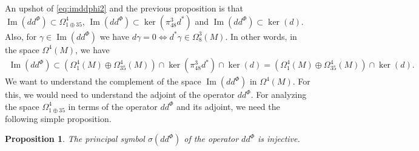 \documentclass[10pt,a4paper,reqno]{article}
\newtheorem{proposition}[theorem]{Proposition}
\theoremstyle{definition}
\numberwithin{equation}{section}
\def\G2{\mathrm{G}_2}
\def\ddphi{dd^{\Phi}}
\DeclareMathOperator{\Ima}{Im}
\begin{document}



An upshot of \cref{eq:imddphi2} and the previous proposition is that $\Ima(\ddphi)\subset \Omega^4_{1\oplus 35}$, $\Ima(\ddphi)\subset \ker(\pi^3_{48}d^*)$ and $\Ima(\ddphi)\subset \ker(d)$. Also, for $\gamma \in \Ima(\ddphi)$ we have $d\gamma=0 \iff d^*\gamma \in \Omega^3_8(M)$. In other words, in the space $\Omega^4(M)$, we have
\begin{align}\label{eq:imddphichar}
\Ima(\ddphi)\subset \left(\Omega^4_1(M)\oplus \Omega^4_{35}(M) \right)\cap \ker(\pi^3_{48}d^*)\cap \ker(d)=\left(\Omega^4_1(M)\oplus \Omega^4_{35}(M) \right) \cap \ker(d).
\end{align}
We want to understand the complement of the space $\Ima(\ddphi)$ in $\Omega^4(M)$. For this, we would need to understand the adjoint of the operator $\ddphi$. For analyzing the space $\Omega^4_{1\oplus35}$ in terms of the operator $\ddphi$ and its adjoint, we need the following simple proposition.

\begin{proposition}\label{prop:psymbold}
The principal symbol $\sigma(\ddphi)$ of the operator $\ddphi$ is injective.
\end{proposition}
\end{document}
